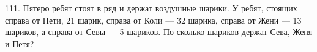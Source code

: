 111. Пятеро ребят стоят в ряд и держат воздушные шарики. У ребят, стоящих справа от Пети, 21 шарик, справа от Коли --- 32 шарика, справа от Жени --- 13 шариков, а справа от Севы --- 5 шариков. По сколько шариков держат Сева, Женя и Петя?\\
